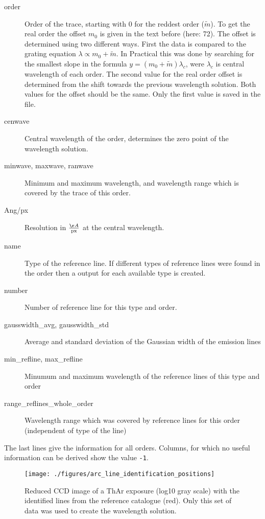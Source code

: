 \documentclass[10pt,a4paper]{article}
\begin{document}
\begin{description}
  \item[order] Order of the trace, starting with 0 for the reddest order ($\tilde{m}$). To get the real order the offset $m_0$ is given in the text before (here: 72). The offset is determined using two different ways. First the data is compared to the grating equation $\lambda \propto m_0 + \tilde{m}$. In Practical this was done by searching for the smallest slope in the formula $y = (m_0 + \tilde{m})\lambda_c$, were $\lambda_c$ is central wavelength of each order. The second value for the real order offset is determined from the shift towards the previous wavelength solution. Both values for the offset should be the same. Only the first value is saved in the file.
  \item[cenwave] Central wavelength of the order, determines the zero point of the wavelength solution.
  \item[minwave, maxwave, ranwave] Minimum and maximum wavelength, and wavelength range which is covered by the trace of this order.
  \item[Ang/px] Resolution in $\frac{\AA}{\mathrm{px}}$ at the central wavelength.
  \item[name] Type of the reference line. If different types of reference lines were found in the order then a output for each available type is created.
  \item[number] Number of reference line for this type and order.
  \item[gausswidth\_avg, gausswidth\_std] Average and standard deviation of the Gaussian width of the emission lines
  \item[min\_refline, max\_refline] Minumum and maximum wavelength of the reference lines of this type and order
  \item[range\_reflines\_whole\_order] Wavelength range which was covered by reference lines for this order (independent of type of the line)
\end{description}
The last lines give the information for all orders. Columns, for which no useful information can be derived show the value \verb|-1|.

\begin{figure} 
  \begin{center}
    \texttt{[image: ./figures/arc\_line\_identification\_positions]}
  \end{center} 
  \caption{Reduced CCD image of a ThAr exposure (log10 gray scale) with the identified lines from the reference catalogue (red). Only this set of data was used to create the wavelength solution.
    \label{figure_arc_line_identification_positions}}
\end{figure}
\end{document}
